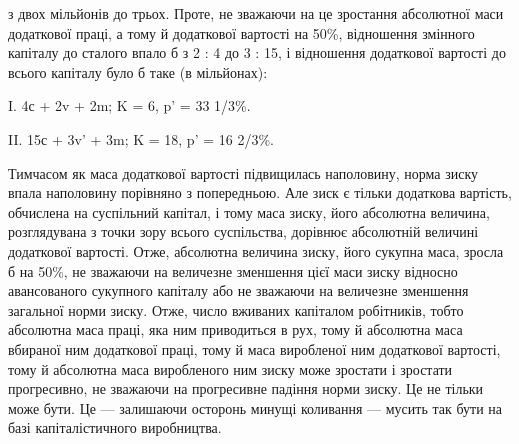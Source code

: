 \parcont{}  %
з двох мільйонів до трьох. Проте, не зважаючи на це зростання
абсолютної маси додаткової праці, а тому й додаткової
вартості на 50\%, відношення змінного капіталу до сталого
впало б з 2 : 4 до 3 : 15, і відношення додаткової вартості до
всього капіталу було б таке (в мільйонах):

I. 4с + 2v + 2m; K = 6, p' = 33 1/3\%.

II. 15с + 3v' + 3m; K = 18, p' = 16 2/3\%.

Тимчасом як маса додаткової вартості підвищилась наполовину,
норма зиску впала наполовину порівняно з попередньою.
Але зиск є тільки додаткова вартість, обчислена на суспільний
капітал, і тому маса зиску, його абсолютна величина, розглядувана
з точки зору всього суспільства, дорівнює абсолютній величині
додаткової вартості. Отже, абсолютна величина зиску, його
сукупна маса, зросла б на 50\%, не зважаючи на величезне зменшення
цієї маси зиску відносно авансованого сукупного капіталу
або не зважаючи на величезне зменшення загальної норми зиску.
Отже, число вживаних капіталом робітників, тобто абсолютна
маса праці, яка ним приводиться в рух, тому й абсолютна маса
вбираної ним додаткової праці, тому й маса виробленої ним додаткової
вартості, тому й абсолютна маса виробленого ним зиску
може зростати і зростати прогресивно, не зважаючи на прогресивне
падіння норми зиску. Це не тільки може бути. Це — залишаючи
осторонь минущі коливання — мусить так бути на базі
капіталістичного виробництва.

